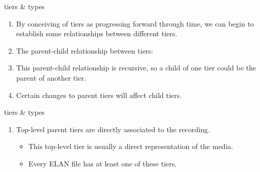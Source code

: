 \documentclass{beamer}
\begin{document}
     \begin{frame}{tiers \& types}
       \begin{enumerate}
         \item<1-> By conceiving of tiers as progressing forward through time, we can begin to establish some relationships between different tiers. 
         \item<2-> The parent-child relationship between tiers:
         \item<4-> This parent-child relationship is recursive, so a child of one tier could be the parent of another tier.
         \item<5-> Certain changes to parent tiers will affect child tiers. 
       \end{enumerate}
    \end{frame}
    
    \begin{frame}{tiers \& types}
    \begin{enumerate}
      \item<1-> Top-level parent tiers are directly associated to the recording.
        \begin{itemize}
          \item<2-> This top-level tier is usually a direct representation of the media.
          \item<2-> Every ELAN file has at least one of these tiers.
        \end{itemize}
    \end{enumerate}
    \end{frame}
    
\end{document}
